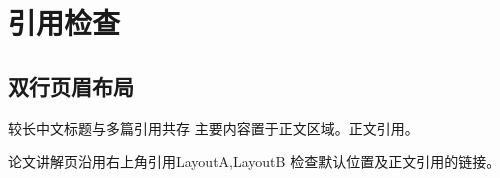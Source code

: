 \documentclass{campusbeamer}
\begin{document}
\section{引用检查}
\subsection{双行页眉布局}
\begin{frame}{较长中文标题与多篇引用共存}
  \vfill 主要内容置于正文区域。正文引用\cite{LayoutA,LayoutB}。\vfill
\end{frame}
\begin{paperframe}{论文讲解页沿用右上角引用}{LayoutA,LayoutB}
  \vfill 检查默认位置及正文引用\cite{LayoutA,LayoutB}的链接。\vfill
\end{paperframe}
\end{document}
